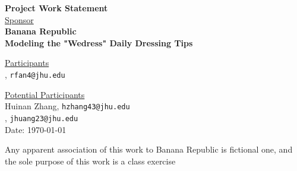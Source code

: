 \documentclass[12pt,letterpaper]{article}
\theoremstyle{definition}
\begin{document}
\def\shiftdowna{0.32in}  %
\def\shiftdownb{0.22in}  %


\begin{center}
\textbf{{\large Project Work Statement}}\\


\vspace \shiftdowna
\underline {Sponsor}\\ 
\vspace{5pt}
\textbf{{\large Banana Republic}}\\


\vspace \shiftdowna
\textbf{{\large Modeling the "Wedress" Daily Dressing Tips}}


\vspace{0.35in}
\vspace \shiftdownb
\underline {Participants} \\
\vspace{5pt}
, \texttt{rfan4@jhu.edu}

\vspace \shiftdownb
\underline {Potential Participants}\\
\vspace{5pt}
Huinan Zhang, \texttt{hzhang43@jhu.edu} \\
\vspace{3pt}
, \texttt{jhuang23@jhu.edu} \\


\vspace \shiftdowna
Date: \today

\end{center}

\vfill  
\footnoterule
\noindent \small{Any apparent association of this work to Banana Republic is
fictional one, and the sole purpose of this work is a class exercise}

\newpage
\end{document}
